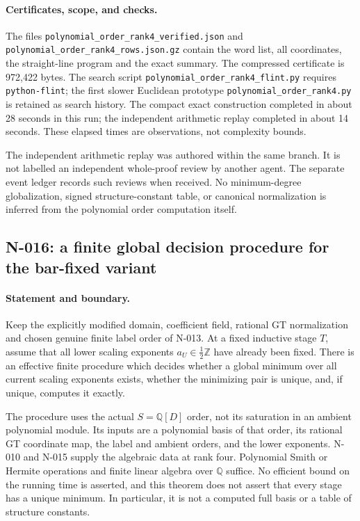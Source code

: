 \paragraph{Certificates, scope, and checks.}
The files
\nolinkurl{polynomial_order_rank4_verified.json} and
\nolinkurl{polynomial_order_rank4_rows.json.gz} contain the
word list, all coordinates, the straight-line program and
the exact summary.  The compressed certificate is 972,422
bytes.  The search script
\nolinkurl{polynomial_order_rank4_flint.py} requires
\texttt{python-flint}; the first slower Euclidean prototype
\nolinkurl{polynomial_order_rank4.py} is retained as search
history.  The compact exact construction completed in
about 28 seconds in this run; the independent arithmetic
replay completed in about 14 seconds.  These elapsed times
are observations, not complexity bounds.

The independent arithmetic replay was authored within the
same branch.  It is not labelled an independent whole-proof
review by another agent.  The separate event ledger records
such reviews when received.  No minimum-degree globalization,
signed structure-constant table, or canonical normalization
is inferred from the polynomial order computation itself.


\subsection{N-016: a finite global decision procedure for the bar-fixed variant}
\label{sec:nonstandard-finite-cutoff}

\paragraph{Statement and boundary.}
Keep the explicitly modified domain, coefficient field,
rational GT normalization and chosen genuine finite label
order of N-013.  At a fixed inductive stage $T$, assume that
all lower scaling exponents $a_U\in\tfrac12\mathbb Z$ have
already been fixed.  There is an effective finite procedure
which decides whether a global minimum over all current
scaling exponents exists, whether the minimizing pair is
unique, and, if unique, computes it exactly.

The procedure uses the actual $S=\mathbb Q[D]$ order, not
its saturation in an ambient polynomial module.  Its inputs
are a polynomial basis of that order, its rational GT
coordinate map, the label and ambient orders, and the lower
exponents.  N-010 and N-015 supply the algebraic data at rank
four.  Polynomial Smith or Hermite operations and finite
linear algebra over $\mathbb Q$ suffice.  No efficient bound
on the running time is asserted, and this theorem does not
assert that every stage has a unique minimum.  In particular,
it is not a computed full basis or a table of structure
constants.

